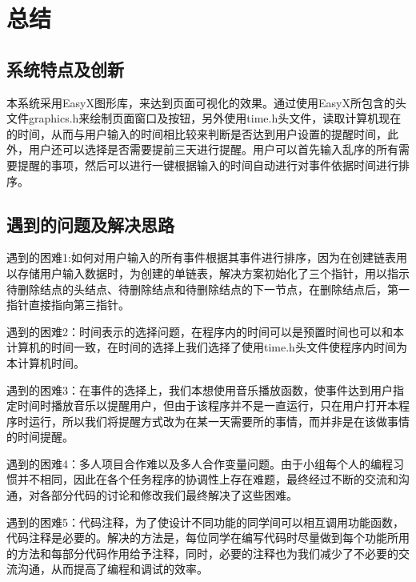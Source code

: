 \documentclass[UTF8]{article}
\begin{document}
\section{总结}
\subsection{系统特点及创新}
本系统采用EasyX图形库，来达到页面可视化的效果。通过使用EasyX所包含的头文件graphics.h来绘制页面窗口及按钮，另外使用time.h头文件，读取计算机现在的时间，从而与用户输入的时间相比较来判断是否达到用户设置的提醒时间，此外，用户还可以选择是否需要提前三天进行提醒。用户可以首先输入乱序的所有需要提醒的事项，然后可以进行一键根据输入的时间自动进行对事件依据时间进行排序。

\subsection{遇到的问题及解决思路}
遇到的困难1:如何对用户输入的所有事件根据其事件进行排序，因为在创建链表用以存储用户输入数据时，为创建的单链表，解决方案初始化了三个指针，用以指示待删除结点的头结点、待删除结点和待删除结点的下一节点，在删除结点后，第一指针直接指向第三指针。

遇到的困难2：时间表示的选择问题，在程序内的时间可以是预置时间也可以和本计算机的时间一致，在时间的选择上我们选择了使用time.h头文件使程序内时间为本计算机时间。

遇到的困难3：在事件的选择上，我们本想使用音乐播放函数，使事件达到用户指定时间时播放音乐以提醒用户，但由于该程序并不是一直运行，只在用户打开本程序时运行，所以我们将提醒方式改为在某一天需要所的事情，而并非是在该做事情的时间提醒。

遇到的困难4：多人项目合作难以及多人合作变量问题。由于小组每个人的编程习惯并不相同，因此在各个任务程序的协调性上存在难题，最终经过不断的交流和沟通，对各部分代码的讨论和修改我们最终解决了这些困难。

遇到的困难5：代码注释，为了使设计不同功能的同学间可以相互调用功能函数，代码注释是必要的。解决的方法是，每位同学在编写代码时尽量做到每个功能所用的方法和每部分代码作用给予注释，同时，必要的注释也为我们减少了不必要的交流沟通，从而提高了编程和调试的效率。



\end{document}
